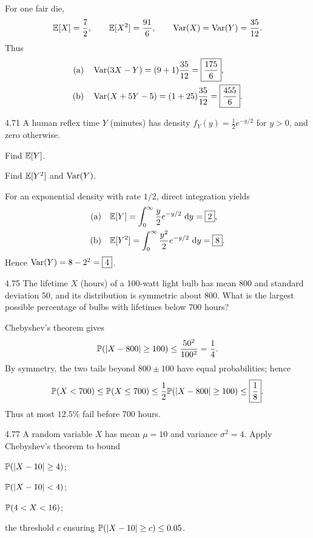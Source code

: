 \documentclass[11pt,oneside]{article}
\begin{document}
\begin{solution}
For one fair die,
\[
\mathbb{E}[X]=\frac72,\qquad \mathbb{E}[X^2]=\frac{91}{6},
\qquad\operatorname{Var}(X)=\operatorname{Var}(Y)=\frac{35}{12}.
\]
Thus
\begin{align*}
\textup{(a)}\quad&\operatorname{Var}(3X-Y)=(9+1)\frac{35}{12}=\boxed{\frac{175}{6}},\\
\textup{(b)}\quad&\operatorname{Var}(X+5Y-5)=(1+25)\frac{35}{12}=\boxed{\frac{455}{6}}.
\end{align*}
\end{solution}

\begin{exercise}{4.71}
A human reflex time $Y$ (minutes) has density $f_Y(y)=\frac12 e^{-y/2}$ for $y>0$, and zero otherwise.
\begin{exercisesubparts}
\item Find $\mathbb{E}[Y]$.
\item Find $\mathbb{E}[Y^2]$ and $\operatorname{Var}(Y)$.
\end{exercisesubparts}
\end{exercise}

\begin{solution}
For an exponential density with rate $1/2$, direct integration yields
\begin{align*}
\textup{(a)}\quad&\mathbb{E}[Y]=\int_0^\infty\frac y2 e^{-y/2}\,\mathop{}\!\mathrm{d} y=\boxed{2},\\
\textup{(b)}\quad&\mathbb{E}[Y^2]=\int_0^\infty\frac{y^2}2 e^{-y/2}\,\mathop{}\!\mathrm{d} y=\boxed{8}.
\end{align*}
Hence $\operatorname{Var}(Y)=8-2^2=\boxed{4}$.
\end{solution}

\begin{exercise}{4.75}
The lifetime $X$ (hours) of a 100-watt light bulb has mean 800 and standard deviation 50, and its distribution is symmetric about 800. What is the largest possible percentage of bulbs with lifetimes below 700 hours?
\end{exercise}

\begin{solution}
Chebyshev's theorem gives
\[
\mathbb{P}(|X-800|\ge100)\le\frac{50^2}{100^2}=\frac14.
\]
By symmetry, the two tails beyond $800\pm100$ have equal probabilities; hence
\[
\mathbb{P}(X<700)\le\mathbb{P}(X\le700)
\le\frac12\mathbb{P}(|X-800|\ge100)\le\boxed{\frac18}.
\]
Thus at most $\boxed{12.5\%}$ fail before 700 hours.
\end{solution}

\begin{exercise}{4.77}
A random variable $X$ has mean $\mu=10$ and variance $\sigma^2=4$. Apply Chebyshev's theorem to bound
\par
\begin{exercisesubparts}
\item $\mathbb{P}(|X-10|\ge4)$;
\item $\mathbb{P}(|X-10|<4)$;
\item $\mathbb{P}(4<X<16)$;
\item the threshold $c$ ensuring $\mathbb{P}(|X-10|\ge c)\le0.05$.
\end{exercisesubparts}
\end{exercise}
\end{document}
